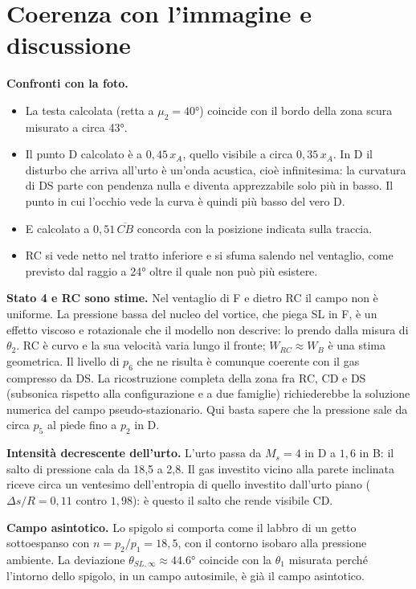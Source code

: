 \documentclass[11pt,a4paper]{article}
\newcommand{\Ms}{M_{s}}
\begin{document}
\section{Coerenza con l'immagine e discussione}
\textbf{Confronti con la foto.}
\begin{itemize}
\item La testa calcolata (retta a $\mu_2=\ang{40}$) coincide con il bordo della zona scura misurato a circa \ang{43}.
\item Il punto D calcolato è a $0{,}45\,x_A$, quello visibile a circa $0{,}35\,x_A$. In D il disturbo che arriva
  all'urto è un'onda acustica, cioè infinitesima: la curvatura di DS parte con pendenza nulla e diventa apprezzabile
  solo più in basso. Il punto in cui l'occhio vede la curva è quindi più basso del vero D.
\item E calcolato a $0{,}51\,\overline{CB}$ concorda con la posizione indicata sulla traccia.
\item RC si vede netto nel tratto inferiore e si sfuma salendo nel ventaglio, come previsto dal raggio a \ang{24}
  oltre il quale non può più esistere.
\end{itemize}

\textbf{Stato 4 e RC sono stime.} Nel ventaglio di F e dietro RC il campo non è uniforme. La pressione bassa del
nucleo del vortice, che piega SL in F, è un effetto viscoso e rotazionale che il modello non descrive: lo prendo dalla
misura di $\theta_2$. RC è curvo e la sua velocità varia lungo il fronte; $W_{RC}\approx W_B$ è una stima geometrica.
Il livello di $p_6$ che ne risulta è comunque coerente con il gas compresso da DS. La ricostruzione completa della
zona fra RC, CD e DS (subsonica rispetto alla configurazione e a due famiglie) richiederebbe la soluzione numerica del
campo pseudo-stazionario. Qui basta sapere che la pressione sale da circa $p_5$ al piede fino a $p_2$ in D.

\textbf{Intensità decrescente dell'urto.} L'urto passa da $\Ms=4$ in D a $1{,}6$ in B: il salto di pressione cala da
18,5 a 2,8. Il gas investito vicino alla parete inclinata riceve circa un ventesimo dell'entropia di quello investito
dall'urto piano ($\Delta s/R=0{,}11$ contro $1{,}98$): è questo il salto che rende visibile CD.

\textbf{Campo asintotico.} Lo spigolo si comporta come il labbro di un getto sottoespanso con $n=p_2/p_1=18{,}5$, con il
contorno isobaro alla pressione ambiente. La deviazione $\theta_{SL,\infty}\approx\ang{44.6}$ coincide con la $\theta_1$
misurata perché l'intorno dello spigolo, in un campo autosimile, è già il campo asintotico.
\end{document}
